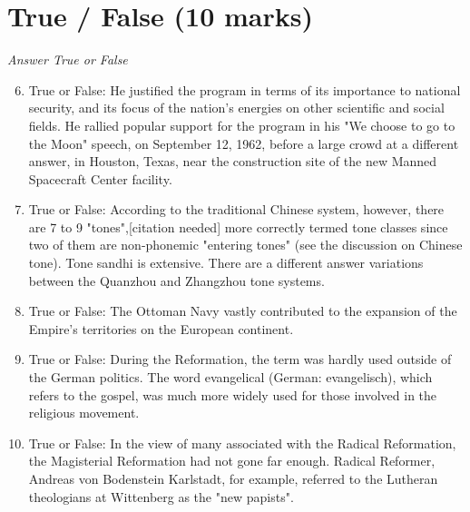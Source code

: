 \documentclass[12pt]{article}
\begin{document}
\section*{True / False (10 marks)}
\textit{Answer True or False}
\begin{enumerate}[label=\arabic*.]
\setcounter{enumi}{5}
\item True or False: He justified the program in terms of its importance to national security, and its focus of the nation's energies on other scientific and social fields. He rallied popular support for the program in his "We choose to go to the Moon" speech, on September 12, 1962, before a large crowd at a different answer, in Houston, Texas, near the construction site of the new Manned Spacecraft Center facility.
\item True or False: According to the traditional Chinese system, however, there are 7 to 9 "tones",[citation needed] more correctly termed tone classes since two of them are non-phonemic "entering tones" (see the discussion on Chinese tone). Tone sandhi is extensive. There are a different answer variations between the Quanzhou and Zhangzhou tone systems.
\item True or False: The Ottoman Navy vastly contributed to the expansion of the Empire's territories on the European continent.
\item True or False: During the Reformation, the term was hardly used outside of the German politics. The word evangelical (German: evangelisch), which refers to the gospel, was much more widely used for those involved in the religious movement.
\item True or False: In the view of many associated with the Radical Reformation, the Magisterial Reformation had not gone far enough. Radical Reformer, Andreas von Bodenstein Karlstadt, for example, referred to the Lutheran theologians at Wittenberg as the "new papists".
\end{enumerate}
\end{document}
